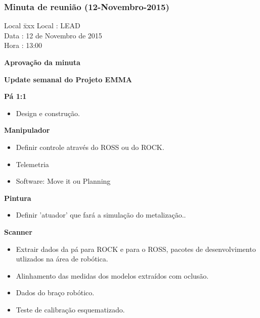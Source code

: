 \subsubsection{Minuta de reunião (12-Novembro-2015)}

\begin{tabbing}
  Local \= xxx \kill
  Local \> : LEAD \\
  Data  \> : 12 de Novembro de 2015 \\
  Hora  \> : 13:00
\end{tabbing} 


\textbf{Aprovação da minuta}

\textbf{Update semanal do Projeto EMMA} 

   									
					
		
		\item \textbf{Pá 1:1}
			\begin{itemize} 
			    \item Design e construção.
			\end{itemize}
			
		\item \textbf{Manipulador}
			\begin{itemize} 
			    \item Definir controle através do ROSS ou do ROCK.
			    \item Telemetria
			    \item Software: Move it ou Planning
			\end{itemize}	

		\item \textbf{Pintura\Coating}
			\begin{itemize} 
			    \item Definir 'atuador' que fará a simulação do metalização..
			\end{itemize}	
		
		\item \textbf{Scanner}
			\begin{itemize} 
			    \item Extrair dados da pá para  ROCK e para o ROSS, pacotes de
			    desenvolvimento utlizados na área de robótica.
			    \item Alinhamento das medidas dos modelos extraídos com oclusão.
			    \item Dados do braço robótico.
			    \item Teste de calibração esquematizado.
			\end{itemize}
			
